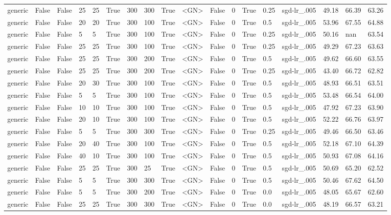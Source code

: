 \begin{adjustbox}{rotate=90,height=\textheight,width=\textwidth}
\begin{tabular}{llllllllllllllllll}
generic & False & False & 25 & 25 & True & 300 & 300 & True & <GN> & False & 0 & True & 0.25 & sgd-lr\_.005 & 49.18 & 66.39 & 63.26\\
generic & False & False & 20 & 20 & True & 300 & 100 & True & <GN> & False & 0 & True & 0.5 & sgd-lr\_.005 & 53.96 & 67.55 & 64.88\\
generic & False & False & 5 & 5 & True & 300 & 100 & True & <GN> & False & 0 & True & 0.25 & sgd-lr\_.005 & 50.16 & nan & 63.54\\
generic & False & False & 25 & 25 & True & 300 & 100 & True & <GN> & False & 0 & True & 0.25 & sgd-lr\_.005 & 49.29 & 67.23 & 63.63\\
generic & False & False & 25 & 25 & True & 300 & 200 & True & <GN> & False & 0 & True & 0.5 & sgd-lr\_.005 & 49.62 & 66.60 & 63.55\\
generic & False & False & 25 & 25 & True & 300 & 200 & True & <GN> & False & 0 & True & 0.25 & sgd-lr\_.005 & 43.40 & 66.72 & 62.82\\
generic & False & False & 20 & 30 & True & 300 & 100 & True & <GN> & False & 0 & True & 0.5 & sgd-lr\_.005 & 48.93 & 66.51 & 63.51\\
generic & False & False & 5 & 5 & True & 300 & 100 & True & <GN> & False & 0 & True & 0.5 & sgd-lr\_.005 & 53.48 & 66.54 & 64.00\\
generic & False & False & 10 & 10 & True & 300 & 100 & True & <GN> & False & 0 & True & 0.5 & sgd-lr\_.005 & 47.92 & 67.23 & 63.90\\
generic & False & False & 20 & 10 & True & 300 & 100 & True & <GN> & False & 0 & True & 0.5 & sgd-lr\_.005 & 52.22 & 66.76 & 63.97\\
generic & False & False & 5 & 5 & True & 300 & 300 & True & <GN> & False & 0 & True & 0.25 & sgd-lr\_.005 & 49.46 & 66.50 & 63.46\\
generic & False & False & 20 & 40 & True & 300 & 100 & True & <GN> & False & 0 & True & 0.5 & sgd-lr\_.005 & 52.18 & 67.10 & 64.39\\
generic & False & False & 40 & 10 & True & 300 & 100 & True & <GN> & False & 0 & True & 0.5 & sgd-lr\_.005 & 50.93 & 67.08 & 64.16\\
generic & False & False & 25 & 25 & True & 300 & 25 & True & <GN> & False & 0 & True & 0.5 & sgd-lr\_.005 & 50.69 & 65.20 & 62.52\\
generic & False & False & 5 & 5 & True & 300 & 300 & True & <GN> & False & 0 & True & 0.5 & sgd-lr\_.005 & 50.46 & 67.62 & 64.50\\
generic & False & False & 5 & 5 & True & 300 & 200 & True & <GN> & False & 0 & True & 0.0 & sgd-lr\_.005 & 48.05 & 65.67 & 62.60\\
generic & False & False & 25 & 25 & True & 300 & 300 & True & <GN> & False & 0 & True & 0.0 & sgd-lr\_.005 & 48.19 & 66.57 & 63.21\\
\end{tabular}
\end{adjustbox}

